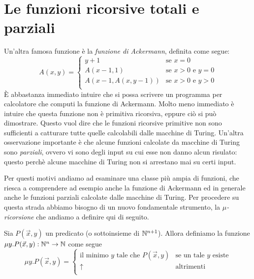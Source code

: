 \documentclass[runningheads,a4paper]{llncs}
\begin{document}
\section{Le funzioni ricorsive totali e parziali}

Un'altra famosa funzione \`{e} la \emph{funzione di Ackermann}, definita come segue:
$$
A(x,y) =
\begin{cases}
y+1 & \mbox{se $x = 0$} \\
A(x-1,1)        & \mbox{se $x > 0$ e $y = 0$} \\
A(x-1,A(x,y-1)) & \mbox{se $x >0$ e $y>0$} \\
\end{cases}
$$
\`{E} abbastanza immediato intuire che si possa scrivere un programma per calcolatore che computi la funzione di Ackermann. Molto meno immediato \`{e} intuire che questa funzione non \`{e} primitiva ricorsiva, eppure ci\`{o} si pu\`{o} dimostrare. Questo vuol dire che le funzioni ricorsive primitive non sono sufficienti a catturare tutte quelle calcolabili dalle macchine di Turing. Un'altra osservazione importante \`{e} che alcune funzioni calcolate da macchine di Turing sono \emph{parziali}, ovvero vi sono degli input su cui esse non danno alcun risulato: questo perch\`{e} alcune macchine di Turing non si arrestano mai su certi input.

Per questi motivi andiamo ad esaminare una classe pi\`{u} ampia di funzioni, che riesca a comprendere ad esempio anche la funzione di Ackermann ed in generale anche le funzioni parziali calcolate dalle macchine di Turing. Per procedere su questa strada abbiamo bisogno di un nuovo fondamentale strumento, la \emph{$\mu$-ricorsione} che andiamo a definire qui di seguito.

\begin{definition}[$\mu$-ricorsione]\label{def:mu-rec}
Sia $P(\vec x,y)$ un predicato (o sottoinsieme di $\mathbb{N}^{n+1}$). Allora definiamo la funzione $\mu y.P(\vec x,y): \mathbb{N}^n \to \mathbb{N}$ come segue
$$
\mu y.P(\vec x,y) = 
\begin{cases}
\mbox{il minimo $y$ tale che $P(\vec x,y)$}& \mbox{se un tale $y$ esiste} \\
\uparrow & \mbox{altrimenti} \\
\end{cases}
$$
\end{definition}
\end{document}
